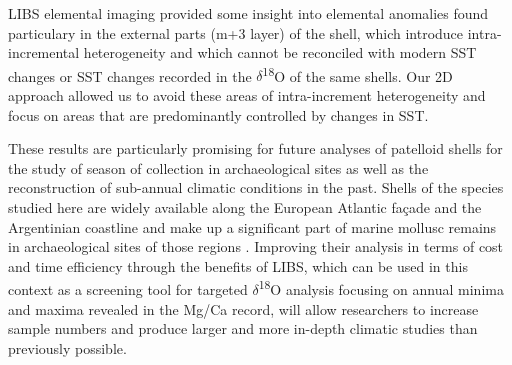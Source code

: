 \documentclass[
  authoryear,
  preprint,
  3p]{elsarticle}
\begin{document}
LIBS elemental imaging provided some insight into elemental anomalies
found particulary in the external parts (m+3 layer) of the shell, which
introduce intra-incremental heterogeneity and which cannot be reconciled
with modern SST changes or SST changes recorded in the
\(\delta\)\textsuperscript{18}O of the same shells. Our 2D approach
allowed us to avoid these areas of intra-increment heterogeneity and
focus on areas that are predominantly controlled by changes in SST.

These results are particularly promising for future analyses of
patelloid shells for the study of season of collection in archaeological
sites as well as the reconstruction of sub-annual climatic conditions in
the past. Shells of the species studied here are widely available along
the European Atlantic façade and the Argentinian coastline and make up a
significant part of marine mollusc remains in archaeological sites of
those regions
\citep{Colonese2011-ab, Villagran2011-ld, Zangrando2016-yl}. Improving
their analysis in terms of cost and time efficiency through the benefits
of LIBS, which can be used in this context as a screening tool for
targeted \(\delta\)\textsuperscript{18}O analysis focusing on annual
minima and maxima revealed in the Mg/Ca record, will allow researchers
to increase sample numbers and produce larger and more in-depth climatic
studies than previously possible.


\renewcommand\refname{References}
  
\end{document}
